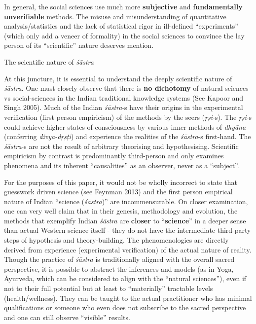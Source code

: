In general, the social sciences use much more {\bf subjective} and {\bf fundamentally unverifiable} methods. The misuse and misunderstanding of quantitative analysis/statistics and the lack of statistical rigor in ill-defined ``experiments'' (which only add a veneer of formality) in the social sciences to convince the lay person of its ``scientific'' nature deserves mention.

The scientific nature of {\sl śāstra}

At this juncture, it is essential to understand the deeply scientific nature of {\sl śāstra}. One must closely observe that there is {\bf no dichotomy} of natural-sciences vs social-sciences in the Indian traditional knowledge systems (See Kapoor and Singh 2005). Much of the Indian {\sl śāstra}-s have their origins in the experimental verification (first person empiricism) of the methods by the seers ({\sl ṛṣi}-s). The {\sl ṛṣi}-s could achieve higher states of consciousness by various inner methods of {\sl dhyāna} (conferring {\sl divya-dṛṣṭi}) and experience the realities of the {\sl śāstra}-s first-hand. The {\sl śāstra}-s are not the result of arbitrary theorising and hypothesising. Scientific empiricism by contrast is predominantly third-person and only examines phenomena and its inherent ``causalities'' as an observer, never as a ``subject''.

For the purposes of this paper, it would not be wholly incorrect to state that guesswork driven science (see Feynman 2013) and the first person empirical nature of Indian ``science ({\sl śāstra})'' are incommensurable. On closer examination, one can very well claim that in their genesis, methodology and  evolution, the methods that exemplify  Indian  {\sl śāstra} are {\bf closer} to ``{\bf science}'' in a deeper sense than actual Western science itself - they do not have the intermediate third-party steps of hypothesis and theory-building. The phenomenologies are directly derived from experience (experimental verification) of the actual nature of reality. Though the practice of {\sl śāstra} is traditionally aligned with the overall sacred perspective, it is possible to abstract the inferences and models (as in Yoga, Āyurveda, which can be considered to align with the ``natural sciences''), even if not to their full potential but at least to ``materially'' tractable levels (health/wellness). They can be taught to the actual practitioner who has minimal qualifications or someone who even does not subscribe to the sacred perspective and one can still observe ``visible'' results.

